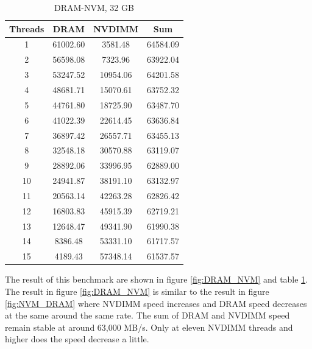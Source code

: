 \documentclass[12pt,a4paper,USenglish]{article}      %
\begin{document}
\begin{table}[!hbtp]
\begin{tabular}{ |c|c|c|c| }
\hline
Threads & DRAM & NVDIMM & Sum \\
\hline
1 & 61002.60 & 3581.48 & 64584.09 \\
\hline
2 & 56598.08 & 7323.96 & 63922.04 \\
\hline
3 & 53247.52 & 10954.06 & 64201.58 \\
\hline
4 & 48681.71 & 15070.61 & 63752.32 \\
\hline
5 & 44761.80 & 18725.90 & 63487.70 \\
\hline
6 & 41022.39 & 22614.45 & 63636.84 \\
\hline
7 & 36897.42 & 26557.71 & 63455.13 \\
\hline
8 & 32548.18 & 30570.88 & 63119.07 \\
\hline
9 & 28892.06 & 33996.95 & 62889.00 \\
\hline
10 & 24941.87 & 38191.10 & 63132.97 \\
\hline
11 & 20563.14 & 42263.28 & 62826.42 \\
\hline
12 & 16803.83 & 45915.39 & 62719.21 \\
\hline
13 & 12648.47 & 49341.90 & 61990.38 \\
\hline
14 & 8386.48 & 53331.10 & 61717.57 \\
\hline
15 & 4189.43 & 57348.14 & 61537.57 \\
\hline
\end{tabular}
\caption{DRAM-NVM, 32 GB}
\label{tab:DRAM_NVM}
\end{table}

The result of this benchmark are shown in figure \ref{fig:DRAM_NVM} and table \ref{tab:DRAM_NVM}. The result in figure \ref{fig:DRAM_NVM} is similar to the result in figure \ref{fig:NVM_DRAM} where NVDIMM speed increases and DRAM speed decreases at the same around the same rate. The sum of DRAM and NVDIMM speed remain stable at around 63,000 MB/s. Only at eleven NVDIMM threads and higher does the speed decrease a little. 
\end{document}
